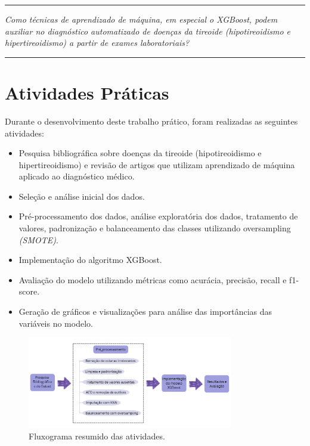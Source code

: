 \documentclass[11pt]{article}
\newcommand{\HRule}[1]{\rule{\linewidth}{#1}}
\begin{document}
\newpage
\par\noindent\rule{\textwidth}{0.4pt}
\begin{center}
    \textit{Como técnicas de aprendizado de máquina, em especial o XGBoost, podem auxiliar no diagnóstico automatizado de doenças da tireoide (hipotireoidismo e hipertireoidismo) a partir de exames laboratoriais?}
\end{center}
\par\noindent\rule{\textwidth}{0.4pt}

 
\section{Atividades Práticas}

Durante o desenvolvimento deste trabalho prático, foram realizadas as seguintes atividades:

\begin{itemize}
    \item Pesquisa bibliográfica sobre doenças da tireoide (hipotireoidismo e hipertireoidismo) e revisão de artigos que utilizam aprendizado de máquina aplicado ao diagnóstico médico.
    \item Seleção e análise inicial dos dados.
    \item Pré-processamento dos dados, análise exploratória dos dados, tratamento de valores, padronização e balanceamento das classes utilizando oversampling \textit{(SMOTE)}.
    \item Implementação do algoritmo XGBoost.
    \item Avaliação do modelo utilizando métricas como acurácia, precisão, recall e f1-score.
    \item Geração de gráficos e visualizações para análise das importâncias das variáveis no modelo.
\end{itemize}

\begin{figure}[H]
    \centering
    \includegraphics[width=0.8\textwidth]{img/fluxogram.png}
    \caption{Fluxograma resumido das atividades.}
    \label{fig:fluxograma_atividades}
\end{figure}
\end{document}
